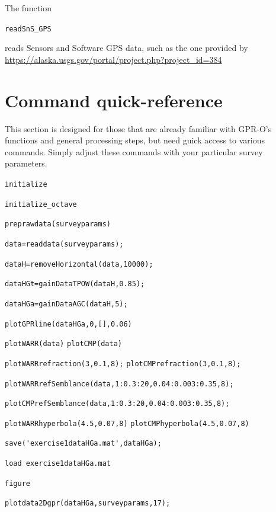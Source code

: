\documentclass[11pt]{article}
\begin{document}
The function

\qquad \verb#readSnS_GPS# 

reads Sensors and Software GPS data, such as the one provided by 
\url{https://alaska.usgs.gov/portal/project.php?project_id=384} 

\section{Command quick-reference}

This section is designed for those that are already familiar with GPR-O's
functions and general processing steps, but need guick access to
various commands. Simply adjust these commands with your particular
survey parameters.

\qquad \verb#initialize#
	
\qquad \verb#initialize_octave#

\qquad \verb#preprawdata(surveyparams)#

\qquad \verb#data=readdata(surveyparams);#

\qquad \verb#dataH=removeHorizontal(data,10000);#

\qquad \verb#dataHGt=gainDataTPOW(dataH,0.85);#

\qquad \verb#dataHGa=gainDataAGC(dataH,5);#

\qquad \verb#plotGPRline(dataHGa,0,[],0.06)#

\qquad \verb#plotWARR(data)#						\qquad \verb#plotCMP(data)#

\qquad \verb#plotWARRrefraction(3,0.1,8);#			\qquad \verb#plotCMPrefraction(3,0.1,8);#

\qquad \verb#plotWARRrefSemblance(data,1:0.3:20,0.04:0.003:0.35,8);#

\qquad \verb#plotCMPrefSemblance(data,1:0.3:20,0.04:0.003:0.35,8);#

\qquad \verb#plotWARRhyperbola(4.5,0.07,8)#			\qquad \verb#plotCMPhyperbola(4.5,0.07,8)#

\qquad \verb#save('exercise1dataHGa.mat',dataHGa);#

\qquad \verb#load exercise1dataHGa.mat#

\qquad \verb#figure#

\qquad \verb#plotdata2Dgpr(dataHGa,surveyparams,17);#
\end{document}
